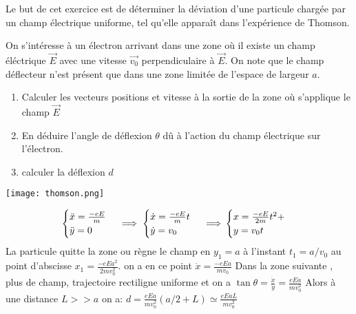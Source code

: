 \begin{Exercise}[title=Déviation d'un électron par un champ électrique]
  \begin{minipage}{.45\linewidth}
    Le but de cet exercice est de déterminer la déviation d'une particule chargée par un champ électrique uniforme, tel qu'elle apparaît dans l'expérience de Thomson.

    On s'intéresse à un électron arrivant dans une zone où il existe un champ éléctrique $\vec{E}$ avec une vitesse $\vec{v_0}$ perpendiculaire à $\vec{E}$. On note que le champ déflecteur n'est présent que dans une zone limitée de l'espace de largeur $a$.
    \begin{enumerate}
    \item Calculer les vecteurs positions et vitesse à la sortie de la zone où s'applique le champ $\vec{E}$
    \item En déduire l'angle de déflexion $\theta$ dû à l'action du champ électrique sur l'électron.
    \item calculer la déflexion $d$
    \end{enumerate}
  \end{minipage}\hspace{.05\linewidth}
  \begin{minipage}{.45\linewidth}
    \texttt{[image: thomson.png]}
  \end{minipage}
\end{Exercise}
\begin{Answer}
		\Question
		\[\begin{cases}
		\ddot{x} =\frac{-eE}{m}\\
		\ddot{y} =0\\
		\end{cases} \implies
		\begin{cases}
		\dot{x} = \frac{-eE}{m}t\\
		\dot{y} = v_0
		\end{cases} \implies\\
		\begin{cases}
		x = \frac{-eE}{2m}t^2 + \\
		y = v_0  t
		\end{cases}
		\]
		La particule quitte la zone ou règne le champ en $y_1=a$ à l'instant $t_1 = a/v_0 $  au point d'abscisse $x_1 = \frac{-eEa^2}{2mv_0^2}$. on a en ce point $\dot{x} = \frac{-eEa}{mv_0}$
		\Question Dans la zone suivante , plus de champ, trajectoire rectiligne uniforme et on a $\tan\theta = \frac{\dot{x}}{\dot{y}} = \frac{eEa}{mv_0^2}$
		\Question Alors à une distance $L >> a$ on a:
		$d = \frac{eEa}{mv_0^2}(a/2+L) \simeq \frac{eEaL}{mv_0^2}$
\end{Answer}
